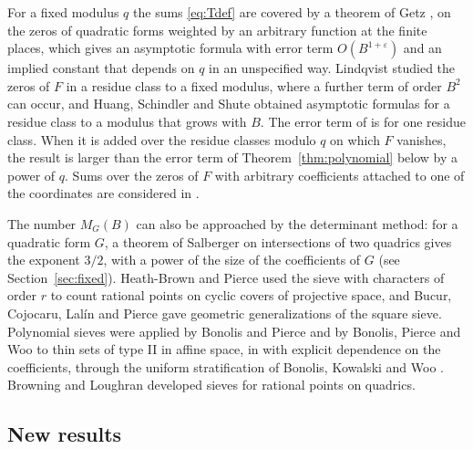 \documentclass[11pt]{amsart}
\numberwithin{equation}{section}
\numberwithin{figure}{section}
\theoremstyle{definition}
\newcommand{\eps}{\varepsilon}
\begin{document}
For a fixed modulus $q$ the sums \eqref{eq:Tdef} are covered by a
theorem of Getz \cite[Theorem~3.3]{G}, on the zeros of quadratic forms
weighted by an arbitrary function at the finite places, which gives
an asymptotic formula with error term $O(B^{1+\eps})$ and an implied
constant that depends on $q$ in an unspecified way. Lindqvist
\cite{L} studied the zeros of $F$ in a residue class to a fixed
modulus, where a further term of order $B^2$ can occur, and Huang,
Schindler and Shute \cite{HSS} obtained asymptotic formulas for a
residue class to a modulus that grows with $B$. The error term of
\cite[Theorem~4.1]{HSS} is for one residue class. When it is added
over the residue classes modulo $q$ on which $F$ vanishes, the result
is larger than the error term of Theorem~\ref{thm:polynomial} below
by a power of $q$. Sums over the zeros
of $F$ with arbitrary coefficients attached to one of the
coordinates are considered in \cite{GSS}.

The number $M_G(B)$ can also be approached by the determinant
method: for a quadratic form $G$, a theorem of Salberger
\cite[Theorem~0.6]{S} on intersections of two quadrics gives the
exponent $3/2$, with a power of the size of the coefficients of $G$
(see Section~\ref{sec:fixed}). Heath-Brown and Pierce \cite{HBP} used
the sieve with characters of order $r$ to count rational points on
cyclic covers of projective space, and Bucur, Cojocaru, Lal\'in and
Pierce \cite{BCLP} gave geometric generalizations of the square
sieve. Polynomial sieves were applied by Bonolis and Pierce \cite{BP}
and by Bonolis, Pierce and Woo \cite{BPW} to thin sets of type II in
affine space, in \cite{BPW} with explicit dependence on the
coefficients, through the uniform stratification of Bonolis,
Kowalski and Woo \cite{BKW}. Browning and Loughran \cite{BL}
developed sieves for rational points on quadrics.

\subsection{New results}\label{sec:results}
\end{document}
